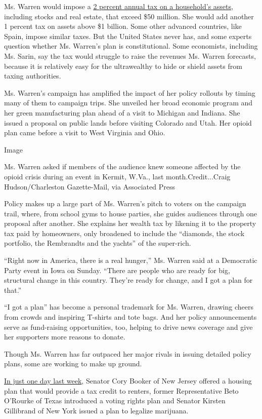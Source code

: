 Ms. Warren would impose a
\href{https://www.nytimes3xbfgragh.onion/2019/02/18/upshot/warren-wealth-tax.html}{2
percent annual tax on a household's assets}, including stocks and real
estate, that exceed \$50 million. She would add another 1 percent tax on
assets above \$1 billion. Some other advanced countries, like Spain,
impose similar taxes. But the United States never has, and some experts
question whether Ms. Warren's plan is constitutional. Some economists,
including Ms. Sarin, say the tax would struggle to raise the revenues
Ms. Warren forecasts, because it is relatively easy for the ultrawealthy
to hide or shield assets from taxing authorities.

Ms. Warren's campaign has amplified the impact of her policy rollouts by
timing many of them to campaign trips. She unveiled her broad economic
program and her green manufacturing plan ahead of a visit to Michigan
and Indiana. She issued a proposal on public lands before visiting
Colorado and Utah. Her opioid plan came before a visit to West Virginia
and Ohio.

Image

Ms. Warren asked if members of the audience knew someone affected by the
opioid crisis during an event in Kermit, W.Va., last
month.Credit...Craig Hudson/Charleston Gazette-Mail, via Associated
Press

Policy makes up a large part of Ms. Warren's pitch to voters on the
campaign trail, where, from school gyms to house parties, she guides
audiences through one proposal after another. She explains her wealth
tax by likening it to the property tax paid by homeowners, only
broadened to include the ``diamonds, the stock portfolio, the Rembrandts
and the yachts'' of the super-rich.

``Right now in America, there is a real hunger,'' Ms. Warren said at a
Democratic Party event in Iowa on Sunday. ``There are people who are
ready for big, structural change in this country. They're ready for
change, and I got a plan for that.''

``I got a plan'' has become a personal trademark for Ms. Warren, drawing
cheers from crowds and inspiring T-shirts and tote bags. And her policy
announcements serve as fund-raising opportunities, too, helping to drive
news coverage and give her supporters more reasons to donate.

Though Ms. Warren has far outpaced her major rivals in issuing detailed
policy plans, some are working to make up ground.

\href{https://www.nytimes3xbfgragh.onion/2019/06/05/us/politics/booker-renters-credit.html}{In
just one day last week}, Senator Cory Booker of New Jersey offered a
housing plan that would provide a tax credit to renters, former
Representative Beto O'Rourke of Texas introduced a voting rights plan
and Senator Kirsten Gillibrand of New York issued a plan to legalize
marijuana.

